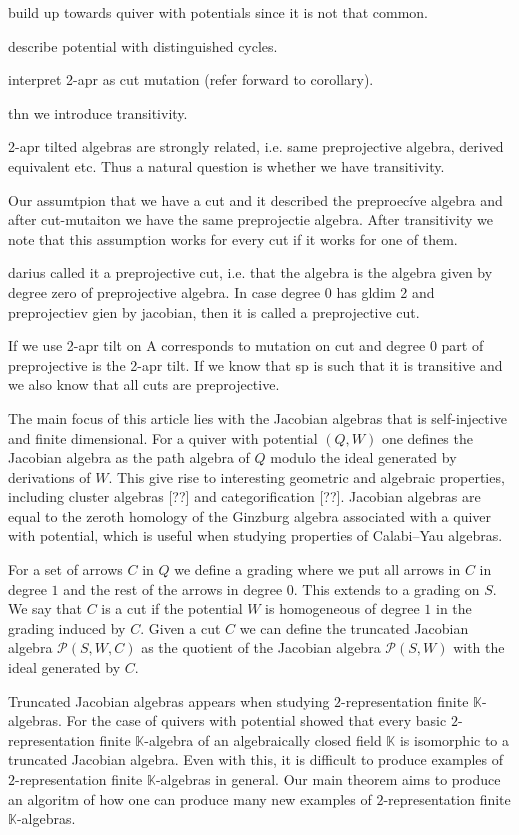 \documentclass[a4paper, reqno]{amsart}
\theoremstyle{definition}
\newcommand{\K}{\mathbb{K}}
\begin{document}
build up towards quiver with potentials since it is not that common.

describe potential with distinguished cycles. 

interpret 2-apr as cut mutation (refer forward to corollary).

thn we introduce transitivity.

2-apr tilted algebras are strongly related, i.e. same preprojective algebra, derived equivalent etc. Thus a natural question is whether we have transitivity.

Our assumtpion that we have a cut and it described the preproecíve algebra and after cut-mutaiton we have the same preprojectie algebra. After transitivity we note that this assumption works for every cut if it works for one of them.

darius called it a preprojective cut, i.e. that the algebra is the algebra given by degree zero of preprojective algebra. In case degree 0 has gldim 2 and preprojectiev gien by jacobian, then it is called a preprojective cut.

If we use 2-apr tilt on A corresponds to mutation on cut and degree 0 part of preprojective is the 2-apr tilt. If we know that sp is such that it is transitive and we also know that all cuts are preprojective. 

The main focus of this article lies with the Jacobian algebras that is self-injective and finite dimensional. For a quiver with potential $(Q, W)$ one defines the Jacobian algebra as the path algebra of $Q$ modulo the ideal generated by derivations of $W$. This give rise to interesting geometric and algebraic properties, including cluster algebras [??] and categorification [??]. Jacobian algebras are equal to the zeroth homology of the Ginzburg algebra \cite{ginzburg2007calabiyaualgebras} associated with a quiver with potential, which is useful when studying properties of Calabi--Yau algebras. 

For a set of arrows $C$ in $Q$ we define a grading where we put all arrows in $C$ in degree $1$ and the rest of the arrows in degree $0$. This extends to a grading on $S$. We say that $C$ is a cut if the potential $W$ is homogeneous of degree $1$ in the grading induced by $C$. Given a cut $C$ we can define the truncated Jacobian algebra $\mathcal{P}(S, W, C)$ as the quotient of the Jacobian algebra $\mathcal{P}(S, W)$ with the ideal generated by $C$.

Truncated Jacobian algebras appears when studying $2$-representation finite $\K$-algebras. For the case of quivers with potential \cite{HerschendOsamu2011quiverwithpotential} showed that every basic $2$-representation finite $\K$-algebra of an algebraically closed field $\K$ is isomorphic to a truncated Jacobian algebra. Even with this, it is difficult to produce examples of $2$-representation finite $\K$-algebras in general. Our main theorem aims to produce an algoritm of how one can produce many new examples of $2$-representation finite $\K$-algebras.
\end{document}

